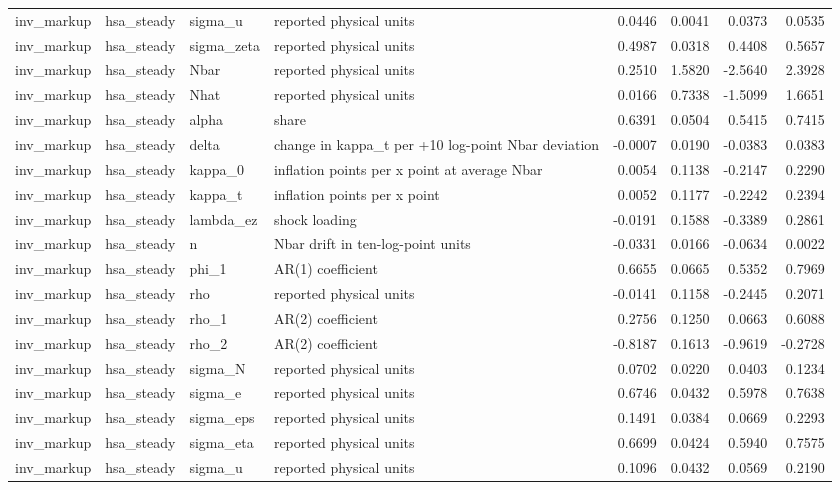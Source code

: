 \begin{tabular}{llllrrrr}
inv\_markup & hsa\_steady & sigma\_u & reported physical units & 0.0446 & 0.0041 & 0.0373 & 0.0535 \\
inv\_markup & hsa\_steady & sigma\_zeta & reported physical units & 0.4987 & 0.0318 & 0.4408 & 0.5657 \\
inv\_markup & hsa\_steady & Nbar & reported physical units & 0.2510 & 1.5820 & -2.5640 & 2.3928 \\
inv\_markup & hsa\_steady & Nhat & reported physical units & 0.0166 & 0.7338 & -1.5099 & 1.6651 \\
inv\_markup & hsa\_steady & alpha & share & 0.6391 & 0.0504 & 0.5415 & 0.7415 \\
inv\_markup & hsa\_steady & delta & change in kappa\_t per +10 log-point Nbar deviation & -0.0007 & 0.0190 & -0.0383 & 0.0383 \\
inv\_markup & hsa\_steady & kappa\_0 & inflation points per x point at average Nbar & 0.0054 & 0.1138 & -0.2147 & 0.2290 \\
inv\_markup & hsa\_steady & kappa\_t & inflation points per x point & 0.0052 & 0.1177 & -0.2242 & 0.2394 \\
inv\_markup & hsa\_steady & lambda\_ez & shock loading & -0.0191 & 0.1588 & -0.3389 & 0.2861 \\
inv\_markup & hsa\_steady & n & Nbar drift in ten-log-point units & -0.0331 & 0.0166 & -0.0634 & 0.0022 \\
inv\_markup & hsa\_steady & phi\_1 & AR(1) coefficient & 0.6655 & 0.0665 & 0.5352 & 0.7969 \\
inv\_markup & hsa\_steady & rho & reported physical units & -0.0141 & 0.1158 & -0.2445 & 0.2071 \\
inv\_markup & hsa\_steady & rho\_1 & AR(2) coefficient & 0.2756 & 0.1250 & 0.0663 & 0.6088 \\
inv\_markup & hsa\_steady & rho\_2 & AR(2) coefficient & -0.8187 & 0.1613 & -0.9619 & -0.2728 \\
inv\_markup & hsa\_steady & sigma\_N & reported physical units & 0.0702 & 0.0220 & 0.0403 & 0.1234 \\
inv\_markup & hsa\_steady & sigma\_e & reported physical units & 0.6746 & 0.0432 & 0.5978 & 0.7638 \\
inv\_markup & hsa\_steady & sigma\_eps & reported physical units & 0.1491 & 0.0384 & 0.0669 & 0.2293 \\
inv\_markup & hsa\_steady & sigma\_eta & reported physical units & 0.6699 & 0.0424 & 0.5940 & 0.7575 \\
inv\_markup & hsa\_steady & sigma\_u & reported physical units & 0.1096 & 0.0432 & 0.0569 & 0.2190 \\

\end{tabular}

